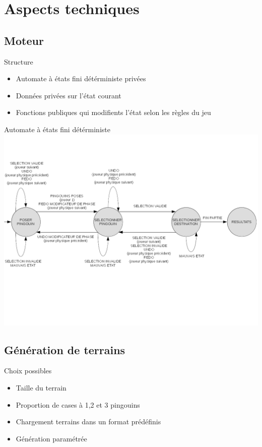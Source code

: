 \documentclass{beamer}
\begin{document}
\section{Aspects techniques}


\subsection{Moteur}

\begin{frame}{Structure}
\begin{block}{}
\begin{itemize}
\item<1-> Automate à états fini détérministe privées
\item<2-> Données privées sur l'état courant
\item<3-> Fonctions publiques qui modifients l'état selon les règles du jeu
\end{itemize}
\end{block}
\end{frame}

\begin{frame}{Automate à états fini détérministe}
\includegraphics[scale=0.4]{AFD}
\end{frame}

\subsection{Génération de terrains}

\begin{frame}{}
\begin{block}{Choix possibles}
\begin{itemize}
\item<1-> Taille du terrain
\item<2-> Proportion de cases à 1,2 et 3 pingouins
\item<3-> Chargement terrains dans un format prédéfinis
\item<4-> Génération paramétrée
\end{itemize}
\end{block}
\end{frame}
\end{document}
